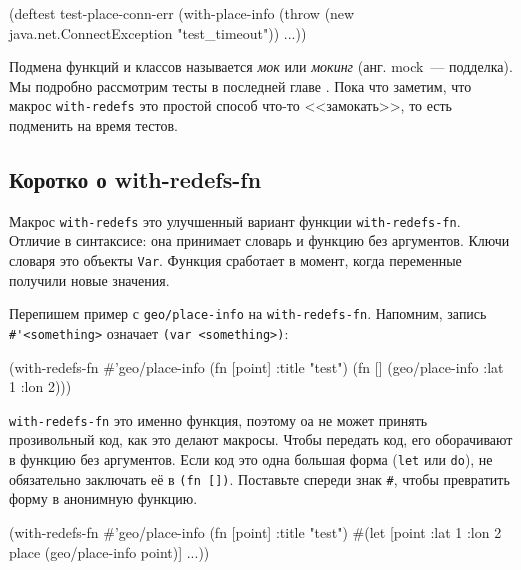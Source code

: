 
\begin{english}
  \begin{clojure}
(deftest test-place-conn-err
  (with-place-info
    (throw (new java.net.ConnectException "test_timeout"))
    ...))
  \end{clojure}
\end{english}


Подмена функций и классов называется \emph{мок} или \emph{мокинг} (анг. mock~---
подделка). Мы подробно рассмотрим тесты в последней
главе . Пока что заметим, что макрос \verb|with-redefs|
это простой способ что-то <<замокать>>, то есть подменить на время тестов.

\subsection{Коротко о with-redefs-fn}


Макрос \verb|with-redefs| это улучшенный вариант функции
\verb|with-redefs-fn|. Отличие в синтаксисе: она принимает словарь и функцию
без аргументов. Ключи словаря это объекты \verb|Var|. Функция сработает в
момент, когда переменные получили новые значения.

Перепишем пример с \verb|geo/place-info| на \verb|with-redefs-fn|. Напомним,
запись \verb|#'<something>| означает \verb|(var <something>)|:

\begin{english}
  \begin{clojure}
(with-redefs-fn
  {#'geo/place-info (fn [point] {:title "test"})}
  (fn []
    (geo/place-info {:lat 1 :lon 2})))
  \end{clojure}
\end{english}


\verb|with-redefs-fn| это именно функция, поэтому оа не может принять
прозивольный код, как это делают макросы. Чтобы передать код, его оборачивают в
функцию без аргументов. Если код это одна большая форма (\verb|let| или
\verb|do|), не обязательно заключать её в \verb|(fn [])|. Поставьте спереди
знак \verb|#|, чтобы превратить форму в анонимную функцию.

\begin{english}
  \begin{clojure}
(with-redefs-fn
  {#'geo/place-info (fn [point] {:title "test"})}
  #(let [point {:lat 1 :lon 2}
         place (geo/place-info point)]
     ...))
  \end{clojure}
\end{english}

